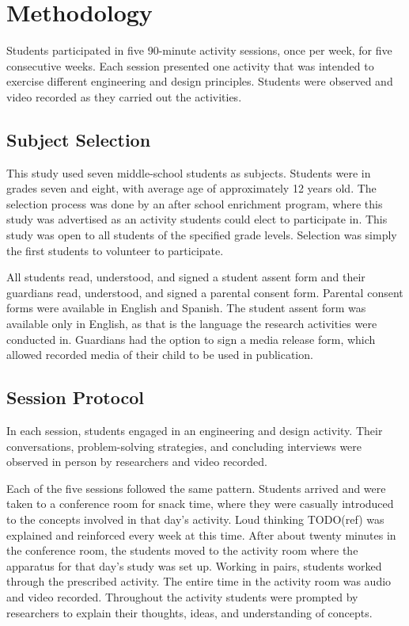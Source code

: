 \chapter{Methodology}

Students participated in five 90-minute activity sessions, once per week, for five consecutive weeks. Each session presented one activity that was intended to exercise different engineering and design principles. Students were observed and video recorded as they carried out the activities. 

\section{Subject Selection} 

This study used seven middle-school students as subjects. Students were in grades seven and eight, with average age of approximately 12 years old.  The selection process was done by an after school enrichment program, where this study was advertised as an activity students could elect to participate in.  This study was open to all students of the specified grade levels. Selection was simply the first students to volunteer to participate.

All students read, understood, and signed a student assent form and their guardians read, understood, and signed a parental consent form. Parental consent forms were available in English and Spanish. The student assent form was available only in English, as that is the language the research activities were conducted in. Guardians had the option to sign a media release form, which allowed recorded media of their child to be used in publication. 

\section{Session Protocol}

In each session, students engaged in an engineering and design activity. Their conversations, problem-solving strategies, and concluding interviews were observed in person by researchers and video recorded. 

Each of the five sessions followed the same pattern. Students arrived and were taken to a conference room for snack time, where they were casually introduced to the concepts involved in that day's activity. Loud thinking TODO(ref) was explained and reinforced every week at this time. After about twenty minutes in the conference room, the students moved to the activity room where the apparatus for that day's study was set up. Working in pairs, students worked through the prescribed activity. The entire time in the activity room was  audio and video recorded. Throughout the activity students were prompted by researchers to explain their thoughts, ideas, and understanding of concepts.

